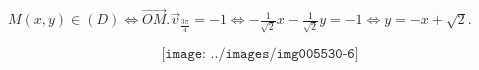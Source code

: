 {\begin{enumerate}
{\begin{center}
$M(x,y)\in(D)\Leftrightarrow\overrightarrow{OM}.\overrightarrow{v}_{\frac{3\pi}{4}}=-1\Leftrightarrow-\frac{1}{\sqrt{2}}x-\frac{1}{\sqrt{2}}y=-1\Leftrightarrow y=-x+\sqrt{2}$.
\end{center}

$$\texttt{[image: ../images/img005530-6]}$$}
\end{enumerate}
}